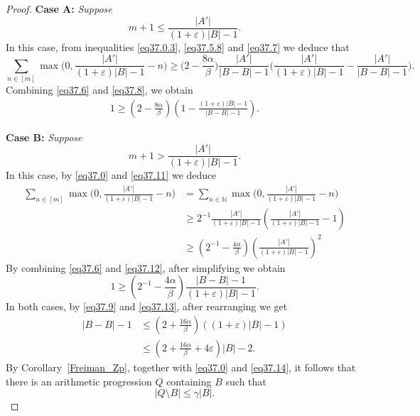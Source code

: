 \documentclass[12pt,reqno]{amsart}
\theoremstyle{definition}
\renewcommand\leq{\leqslant}
\renewcommand\geq{\geqslant}
\renewcommand\ge{\geqslant}
\begin{document}
\begin{proof}
\vspace{7pt}
{\bf Case A: }{\em Suppose
\begin{equation}\label{eq37.7}
m+1 \leq \frac{|A'|}{(1+\varepsilon)|B|-1}.
\end{equation}
}
In this case, from inequalities \eqref{eq37.0.3}, \eqref{eq37.5.8} and \eqref{eq37.7} we deduce that
\begin{equation}\label{eq37.8}
\sum_{n \in [m]}\max\bigg(0,\frac{|A'|}{(1+\varepsilon)|B|-1}-n\bigg)
\ge \big(2-\frac{8\alpha}{\beta}\big) \frac{|A'|}{|B-B|-1}\bigg(\frac{|A'|}{(1+\varepsilon)|B|-1}-\frac{|A'|}{|B-B|-1}\bigg).
\end{equation}
Combining \eqref{eq37.6} and \eqref{eq37.8}, we obtain
\begin{equation}\label{eq37.9}
\begin{split}
1 \geq (2-\frac{8\alpha}{\beta}) (1- \frac{(1+\varepsilon)|B|-1}{|B-B|-1}).
\end{split}
\end{equation}





\vspace{7pt}
{\bf Case B: }{\em Suppose
\begin{equation}\label{eq37.11}
m+1 > \frac{|A'|}{(1+\varepsilon)|B|-1}.
\end{equation}
}
In this case,
by \eqref{eq37.0} and \eqref{eq37.11} we deduce
\begin{equation}\label{eq37.12}
    \begin{split}
        \sum_{n \in [m]}\max\bigg(0,\frac{|A'|}{(1+\varepsilon)|B|-1}-n\bigg) &=
        \sum_{n \in \mathbb{N}}\max\bigg(0,\frac{|A'|}{(1+\varepsilon)|B|-1}-n\bigg)\\
        &\geq 2^{-1}\frac{|A'|}{(1+\varepsilon)|B|-1}(\frac{|A'|}{(1+\varepsilon)|B|-1}-1)\\
        &\geq (2^{-1}-\frac{4\alpha}{\beta}) (\frac{|A'|}{(1+\varepsilon)|B|-1})^2
    \end{split}
\end{equation}
By combining \eqref{eq37.6} and \eqref{eq37.12}, after simplifying we obtain
\begin{equation}\label{eq37.13}
    1\geq (2^{-1}-\frac{4\alpha}{\beta}) \frac{|B-B|-1}{(1+\varepsilon)|B|-1}.
\end{equation}
In both cases, by \eqref{eq37.9} and \eqref{eq37.13}, after rearranging we get
\begin{equation}\label{eq37.14}
\begin{split}
|B-B|-1
&\leq (2+\frac{16 \alpha}{\beta})((1+\varepsilon)|B|-1)\\
&\leq (2+\frac{16\alpha}{\beta}+4\varepsilon)|B|-2.
\end{split}
\end{equation}
By Corollary~\ref{Freiman_Zp}, together with \eqref{eq37.0} and \eqref{eq37.14}, it follows that there is an arithmetic progression $Q$ containing $B$ such that $$ |Q \setminus B| \leq \gamma|B|.$$


\end{proof}
\end{document}
